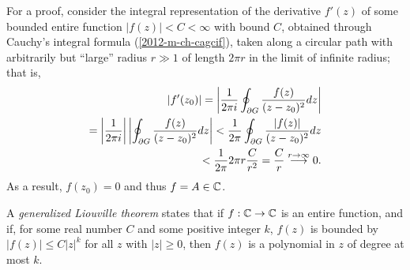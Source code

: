 {\color{OliveGreen}
\bproof
For a proof, consider the integral representation of the derivative $f'(z)$
of some bounded entire function $\vert f(z)\vert <C <\infty$ with bound $C$,
obtained through Cauchy's integral formula (\ref{2012-m-ch-cagcif}),
taken along a circular path with arbitrarily but ``large'' radius $r \gg 1$ of length $2\pi r$ in the limit of infinite radius;
that is,
 \begin{equation}
\begin{split}
\left| f'(z_0) \right| = \left|
{1\over 2\pi i}\oint_{\partial G}{f(z)\over
 (z-z_0)^{2}}dz
\right|   \\
=
\left|
{1\over 2\pi i}
\right|
\left|
\oint_{\partial G}{  f(z)  \over
 (z-z_0)^{2}}dz \right|
<
{1\over 2\pi }
\oint_{\partial G}{ \left| f(z)\right|  \over
 (z-z_0)^{2}}dz   \\
<  \frac{1}{2\pi } 2\pi r  \frac{C}{r^2}
=  \frac{C}{r} \stackrel{r\rightarrow \infty}{\longrightarrow} 0   .
\end{split}
 \end{equation}
As a result, $f(z_0)=0$ and thus $f = A \in {\Bbb C}$.
\eproof
}


A
{\em generalized Liouville theorem}
states that if $f: {\Bbb C} \rightarrow {\Bbb C}$ is an entire function,
and if,
for some real number $C$ and some positive integer $k$, $f(z)$ is bounded by
$\vert f(z)\vert \le C \vert z \vert^k$ for all $z$ with $\vert z \vert \ge 0$,
then $f(z)$ is a polynomial in $z$ of degree at most $k$.

